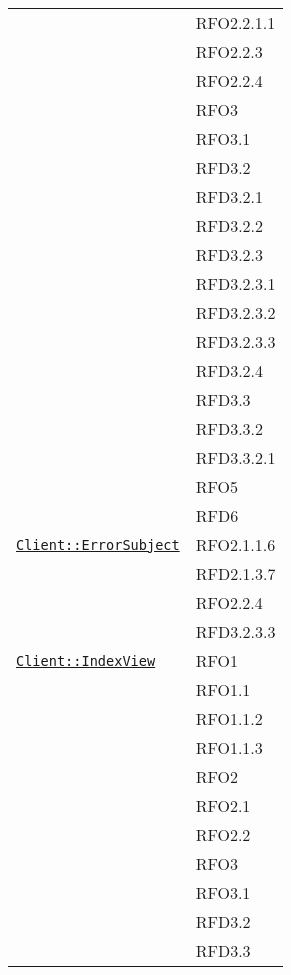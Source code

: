 \begin{longtable}{|>{\centering}m{10cm}|m{3cm}<{\centering}|}
& RFO2.2.1.1\\
& RFO2.2.3\\
& RFO2.2.4\\
& RFO3\\
& RFO3.1\\
& RFD3.2\\
& RFD3.2.1\\
& RFD3.2.2\\
& RFD3.2.3\\
& RFD3.2.3.1\\
& RFD3.2.3.2\\
& RFD3.2.3.3\\
& RFD3.2.4\\
& RFD3.3\\
& RFD3.3.2\\
& RFD3.3.2.1\\
& RFO5\\
& RFD6\\ \hline

\hyperref[Client::ErrorSubject]{\texttt{Client::ErrorSubject}} & RFO2.1.1.6\\
& RFD2.1.3.7\\
& RFO2.2.4\\
& RFD3.2.3.3\\ \hline

\hyperref[Client::IndexView]{\texttt{Client::IndexView}} & RFO1\\
& RFO1.1\\
& RFO1.1.2\\
& RFO1.1.3\\
& RFO2\\
& RFO2.1\\
& RFO2.2\\
& RFO3\\
& RFO3.1\\
& RFD3.2\\
& RFD3.3\\ \hline


\end{longtable}
